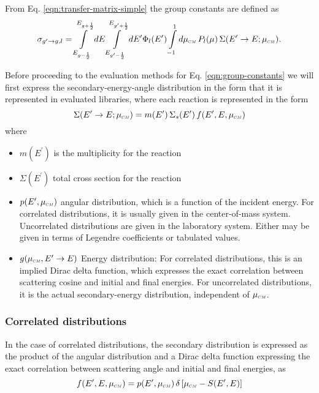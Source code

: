 \documentclass[../main.tex]{subfiles}
\begin{document}
From Eq. \eqref{eqn:transfer-matrix-simple} the group constants are defined as
\begin{equation} \label{eqn:group-constants}
  \sigma_{g^{\prime}\rightarrow g,l} = \int\limits_{E_{g-\frac{1}{2}}}^{E_{g+\frac{1}{2}}} dE \int\limits_{E_{g^{\prime}-\frac{1}{2}}}^{E_{g^{\prime}+\frac{1}{2}}} dE^{\prime} \Phi_l(E^{\prime}) \int\limits_{-1}^{1} d\mucm \, P_l(\mu) \, \Sigma(E^{\prime}\rightarrow E; \mucm).
\end{equation}

Before proceeding to the evaluation methods for Eq. \eqref{eqn:group-constants} we will first express the secondary-energy-angle distribution in the form that it is represented in evaluated libraries, where each reaction is represented in the form
\begin{equation}
  \Sigma(E^{\prime}\rightarrow E; \mucm) = m(E^{\prime}) \, \Sigma_s(E^{\prime}) \, f(E^{\prime},E,\mucm)
\end{equation}
where
\begin{itemize}
  \item $m(E^{\prime})$ is the multiplicity for the reaction
  \item $\Sigma(E^{\prime})$ total cross section for the reaction
  \item $p(E^{\prime},\mucm)$ angular distribution, which is a function of the incident energy. For correlated distributions, it is usually given in the center-of-mass system. Uncorrelated distributions are given in the laboratory system. Either may be given in terms of Legendre coefficients
  or tabulated values.
  \item $g(\mucm, E^{\prime}\rightarrow E)$ Energy distribution: For correlated distributions, this is an implied Dirac delta function, which expresses the exact correlation between scattering cosine and initial and final energies. For uncorrelated distributions, it is the actual secondary-energy
  distribution, independent of $\mucm$.
\end{itemize}


\subsubsection{Correlated distributions}
In the case of correlated distributions, the secondary distribution is expressed as the product of the angular distribution and a Dirac delta function expressing the exact correlation between scattering angle and initial and final energies, as
\begin{equation}
  f(E^{\prime},E,\mucm) = p(E^{\prime},\mucm) \, \delta\left[\mucm - S(E^{\prime},E)\right]
\end{equation}
\end{document}
